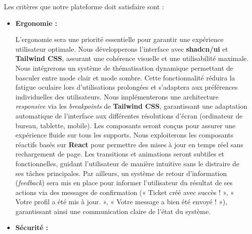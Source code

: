 Les critères que notre plateforme doit satisfaire sont : 
\begin{itemize}[label=$\blacktriangleright$]
\item \textbf{Ergonomie :}

L'ergonomie sera une priorité essentielle pour garantir une expérience utilisateur optimale. Nous développerons l'interface avec \textbf{shadcn/ui} et \textbf{Tailwind CSS}, assurant une cohérence visuelle et une utilisabilité maximale.
\newline
Nous intégrerons un système de thématisation dynamique permettant de basculer entre mode clair et mode sombre. Cette fonctionnalité réduira la fatigue oculaire lors d'utilisations prolongées et s'adaptera aux préférences individuelles des utilisateurs.
\newline
Nous implémenterons une architecture \textit{responsive} via les \textit{breakpoints} de \textbf{Tailwind CSS}, garantissant une adaptation automatique de l'interface aux différentes résolutions d'écran (ordinateur de bureau, tablette, mobile). Les composants seront conçus pour assurer une expérience fluide sur tous les supports.
\newline
Nous exploiterons les composants réactifs basés sur \textbf{React} pour permettre des mises à jour en temps réel sans rechargement de page. Les transitions et animations seront subtiles et fonctionnelles, guidant l'utilisateur de manière intuitive sans le distraire de ses tâches principales.
\newline
Par ailleurs, un système de retour d'information (\textit{feedback}) sera mis en place pour informer l'utilisateur du résultat de ses actions via des messages de confirmation (« Ticket créé avec succès ! », « Votre profil a été mis à jour. », « Votre message a bien été envoyé ! »), garantissant ainsi une communication claire de l'état du système.

\item \textbf{Sécurité :}


\end{itemize}
